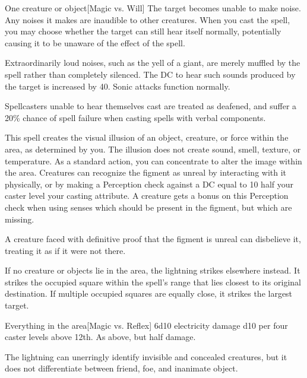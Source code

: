 \spellrng{\rngmed}
\spelldur{\durshort \dismissable}
\begin{spelltarget}{One creature or object}[Magic vs. Will]
    \spelleffect The target becomes unable to make noise. Any noises it makes are inaudible to other creatures. When you cast the spell, you may choose whether the target can still hear itself normally, potentially causing it to be unaware of the effect of the spell.

    Extraordinarily loud noises, such as the yell of a giant, are merely muffled by the spell rather than completely silenced. The DC to hear such sounds produced by the target is increased by 40. Sonic attacks function normally.
\end{spelltarget}
\spellnotes Spellcasters unable to hear themselves cast are treated as deafened, and suffer a 20\% chance of spell failure when casting spells with verbal components.

\spelldur{\durshort}
\spellline
\spelleffect This spell creates the visual illusion of an object, creature, or force within the area, as determined by you. The illusion does not create sound, smell, texture, or temperature. As a standard action, you can concentrate to alter the image within the area.
\spellnotes Creatures can recognize the figment as unreal by interacting with it physically, or by making a Perception check against a DC equal to 10 \add half your caster level \add your casting attribute. A creature gets a  bonus on this Perception check when using senses which should be present in the figment, but which are missing.

A creature faced with definitive proof that the figment is unreal can disbelieve it, treating it as if it were not there.

\spellrng{\rngext}
\spellspecial If no creature or objects lie in the area, the lightning strikes elsewhere instead. It strikes the  occupied square within the spell's range that lies closest to its original destination. If multiple occupied squares are equally close, it strikes the largest target.
\begin{spelltargets}{Everything in the area}[Magic vs. Reflex]
    \spellsuccess 6d10 electricity damage \add d10 per four caster levels above 12th.
    \spellfailure As above, but half damage.
\end{spelltargets}
\spellnotes The lightning can unerringly identify invisible and concealed creatures, but it does not differentiate between friend, foe, and inanimate object.

